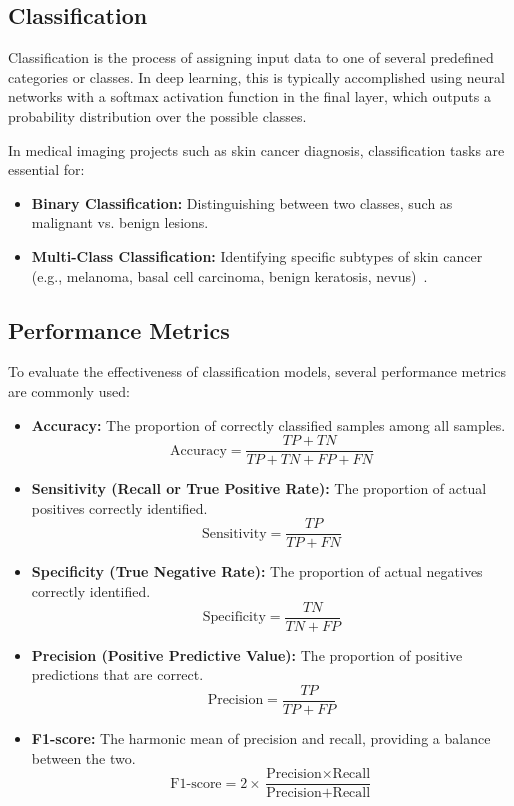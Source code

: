 \documentclass[a4paper,12pt]{report}
\begin{document}
\begin{spacing}{1.5}
    \section{Classification}
    Classification is the process of assigning input data to one of several predefined categories or classes. In deep learning, this is typically accomplished using neural networks with a softmax activation function in the final layer, which outputs a probability distribution over the possible classes.

    In medical imaging projects such as skin cancer diagnosis, classification tasks are essential for:
    \begin{itemize}
        \item \textbf{Binary Classification:} Distinguishing between two classes, such as malignant vs. benign lesions.
        \item \textbf{Multi-Class Classification:} Identifying specific subtypes of skin cancer (e.g., melanoma, basal cell carcinoma, benign keratosis, nevus)~\cite{dl6}.
    \end{itemize}

    \subsection*{Performance Metrics}
    To evaluate the effectiveness of classification models, several performance metrics are commonly used:

    \begin{itemize}
        \item \textbf{Accuracy:} The proportion of correctly classified samples among all samples.
        \[
            \text{Accuracy} = \frac{TP + TN}{TP + TN + FP + FN}
        \]
        \item \textbf{Sensitivity (Recall or True Positive Rate):} The proportion of actual positives correctly identified.
        \[
            \text{Sensitivity} = \frac{TP}{TP + FN}
        \]
        \item \textbf{Specificity (True Negative Rate):} The proportion of actual negatives correctly identified.
        \[
            \text{Specificity} = \frac{TN}{TN + FP}
        \]
        \item \textbf{Precision (Positive Predictive Value):} The proportion of positive predictions that are correct.
        \[
            \text{Precision} = \frac{TP}{TP + FP}
        \]
        \item \textbf{F1-score:} The harmonic mean of precision and recall, providing a balance between the two.
        \[
            \text{F1-score} = 2 \times \frac{\text{Precision} \times \text{Recall}}{\text{Precision} + \text{Recall}}
        \]
    \end{itemize}


\end{spacing}
\end{document}
